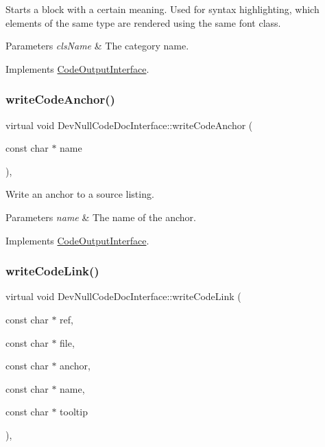 Starts a block with a certain meaning. Used for syntax highlighting, which elements of the same type are rendered using the same \textquotesingle{}font class\textquotesingle{}. 
\begin{DoxyParams}{Parameters}
{\em cls\+Name} & The category name. \\
\hline
\end{DoxyParams}


Implements \mbox{\hyperlink{class_code_output_interface_ac90f75968cdcf127e0b02938bdb49d87}{Code\+Output\+Interface}}.

\mbox{\label{class_dev_null_code_doc_interface_abfa6f09f69831c231f0fe7bb095b8fc4}} 
\subsubsection{\texorpdfstring{writeCodeAnchor()}{writeCodeAnchor()}}
{\footnotesize\ttfamily virtual void Dev\+Null\+Code\+Doc\+Interface\+::write\+Code\+Anchor (\begin{DoxyParamCaption}\item[{const char $\ast$}]{name }\end{DoxyParamCaption})\hspace{0.3cm}{\ttfamily [inline]}, {\ttfamily [virtual]}}

Write an anchor to a source listing. 
\begin{DoxyParams}{Parameters}
{\em name} & The name of the anchor. \\
\hline
\end{DoxyParams}


Implements \mbox{\hyperlink{class_code_output_interface_a1f6394c4ef7c4143de90bcaf3a65c0b4}{Code\+Output\+Interface}}.

\mbox{\label{class_dev_null_code_doc_interface_a44ad7fe7fba94cb200fd0d53642b1909}} 
\subsubsection{\texorpdfstring{writeCodeLink()}{writeCodeLink()}}
{\footnotesize\ttfamily virtual void Dev\+Null\+Code\+Doc\+Interface\+::write\+Code\+Link (\begin{DoxyParamCaption}\item[{const char $\ast$}]{ref,  }\item[{const char $\ast$}]{file,  }\item[{const char $\ast$}]{anchor,  }\item[{const char $\ast$}]{name,  }\item[{const char $\ast$}]{tooltip }\end{DoxyParamCaption})\hspace{0.3cm}{\ttfamily [inline]}, {\ttfamily [virtual]}}

